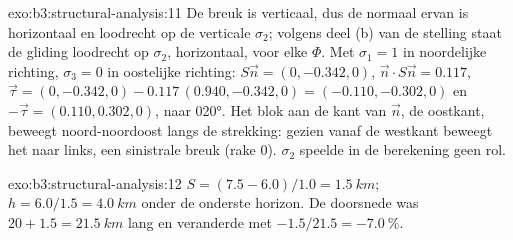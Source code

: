 \begin{solution}{exo:b3:structural-analysis:11}
De breuk is verticaal, dus de normaal ervan is horizontaal en loodrecht op de
verticale $\sigma_2$; volgens deel (b) van de stelling staat de gliding loodrecht op
$\sigma_2$, horizontaal, voor elke $\Phi$. Met $\sigma_1 = 1$ in noordelijke richting,
$\sigma_3 = 0$ in oostelijke richting: $S\vec n = (0, -0.342, 0)$, $\vec n\cdot S\vec n =
0.117$, $\vec\tau = (0, -0.342, 0) - 0.117\,(0.940, -0.342, 0) = (-0.110,
-0.302, 0)$ en $-\vec\tau = (0.110, 0.302, 0)$, naar \ang{020}. Het blok
aan de kant van $\vec n$, de oostkant, beweegt noord-noordoost langs de
strekking: gezien vanaf de westkant beweegt het naar links, een sinistrale breuk (rake
0). $\sigma_2$ speelde in de berekening geen rol.
\end{solution}

\begin{solution}{exo:b3:structural-analysis:12}
$S = (7.5 - 6.0)/1.0 = \qty{1.5}{km}$; $h = 6.0/1.5 = \qty{4.0}{km}$ onder de
onderste horizon. De doorsnede was $20 + 1.5 = \qty{21.5}{km}$ lang en veranderde
met $-1.5/21.5 = \qty{-7.0}{\percent}$.
\end{solution}

